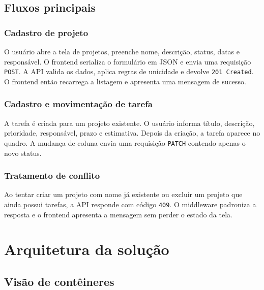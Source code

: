 \documentclass[12pt,a4paper,openany]{report}
\begin{document}
\section{Fluxos principais}

\subsection{Cadastro de projeto}

O usuário abre a tela de projetos, preenche nome, descrição, status, datas e responsável. O frontend serializa o formulário em JSON e envia uma requisição \texttt{POST}. A API valida os dados, aplica regras de unicidade e devolve \texttt{201 Created}. O frontend então recarrega a listagem e apresenta uma mensagem de sucesso.

\subsection{Cadastro e movimentação de tarefa}

A tarefa é criada para um projeto existente. O usuário informa título, descrição, prioridade, responsável, prazo e estimativa. Depois da criação, a tarefa aparece no quadro. A mudança de coluna envia uma requisição \texttt{PATCH} contendo apenas o novo status.

\subsection{Tratamento de conflito}

Ao tentar criar um projeto com nome já existente ou excluir um projeto que ainda possui tarefas, a API responde com código \texttt{409}. O middleware padroniza a resposta e o frontend apresenta a mensagem sem perder o estado da tela.

\chapter{Arquitetura da solução}

\section{Visão de contêineres}
\end{document}
